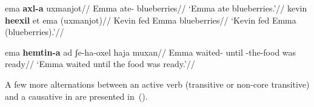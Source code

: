 \pex
	\a \begingl
		\gla ema \textbf{axl-a} uxmanjot//
		\glb Emma ate- blueberries//
		\glft `Emma ate blueberries.'//
	\endgl
	\a \begingl
		\gla kevin \textbf{heexil} et ema (uxmanjot)//
		\glb Kevin fed  Emma blueberries//
		\glft `Kevin fed Emma (blueberries).'//
	\endgl %
\xe

\ex \label{ex:vd:unerg} \begingl
	\gla ema \textbf{hemtin-a} ad ʃe-ha-oxel haja muxan//
	\glb Emma waited- until -the-food was ready//
	\glft `Emma waited until the food was ready.'//
	\endgl
\xe
	
A few more alternations between an active verb {\tkal} (transitive or non-core transitive) and a causative in {\thif} are presented in~(\nextx).
\ex\label{ex:vd:kal-thif}
\xe

